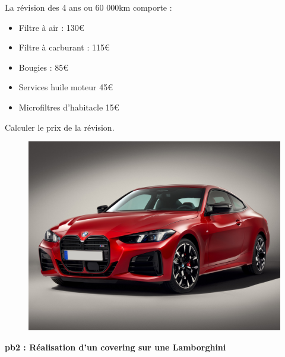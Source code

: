 \begin{multicols}{2}
  La révision des 4 ans ou 60 000km comporte : 

  \begin{itemize}[label={$\bullet$}]
    \item Filtre à air : 130€
    \item Filtre à carburant : 115€
    \item Bougies : 85€ 
    \item Services huile moteur 45€
    \item Microfiltres d'habitacle 15€  
  \end{itemize} 

  Calculer le prix de la révision. \columnbreak

  \begin{figure}[H]
    \centering
    \includegraphics[width=0.6\linewidth]{5x2-inegalite-triangulaire/bmw.jpg}
  \end{figure}
\end{multicols}

\textbf{pb2 : Réalisation d'un covering sur une Lamborghini} \\

